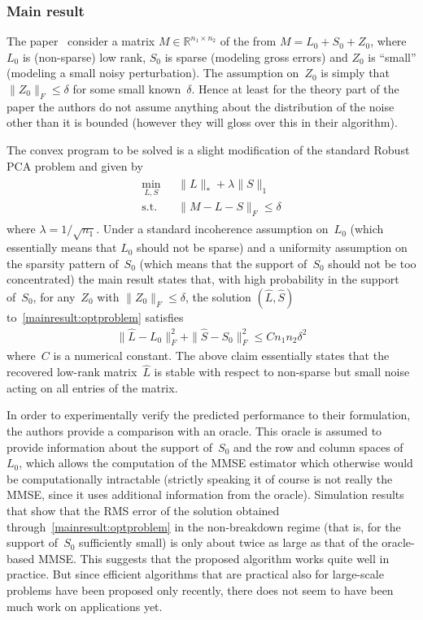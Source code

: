 \subsubsection{Main result}

The paper~\cite{Zhou:2010vn} consider a matrix $M\in\mathbb{R}^{n_1\times n_2}$ of the from $M = L_0+S_0+Z_0$, where~$L_0$ is (non-sparse) low rank, $S_0$ is sparse (modeling gross errors) and $Z_0$ is ``small'' (modeling a small noisy perturbation). The assumption on~$Z_0$ is simply that $\|Z_0\|_F \leq \delta$ for some small known~$\delta$. Hence at least for the theory part of the paper the authors do not assume anything about the distribution of the noise other than it is bounded (however they will gloss over this in their algorithm).

The convex program to be solved is a slight modification of the standard Robust PCA problem and given by
\begin{align}
\begin{split}
\min_{L,S} \; &\|L\|_* + \lambda \|S\|_1 \\
\text{s.t.} \quad &\|M-L-S\|_F \leq \delta
\end{split}
\label{mainresult:optproblem}
\end{align}
where $\lambda = 1/\sqrt{n_1}$. Under a standard incoherence assumption on~$L_0$ (which essentially means that $L_0$ should not be sparse) and a uniformity assumption on the sparsity pattern of~$S_0$ (which means that the support of~$S_0$ should not be too concentrated) the main result states that, with high probability in the support of~$S_0$, for any~$Z_0$ with $\|Z_0\|_F \leq \delta$, the solution $(\hat{L},\hat{S})$ to~\eqref{mainresult:optproblem} satisfies
\begin{align*}
\|\hat{L}-L_0\|_F^2 + \|\hat{S}-S_0\|_F^2 \leq C n_1n_2\delta^2
\end{align*}
where~$C$ is a numerical constant. The above claim essentially states that the recovered low-rank matrix~$\hat{L}$ is stable with respect to non-sparse but small noise acting on all entries of the matrix.

In order to experimentally verify the predicted performance to their formulation, the authors provide a comparison with an oracle. This oracle is assumed to provide information about the support of~$S_0$ and the row and column spaces of~$L_0$, which allows the computation of the MMSE estimator which otherwise would be computationally intractable (strictly speaking it of course is not really the MMSE, since it uses additional information from the oracle). Simulation results that show that the RMS error of the solution obtained through~\eqref{mainresult:optproblem} in the non-breakdown regime (that is, for the support of~$S_0$ sufficiently small) is only about twice as large as that of the oracle-based MMSE. This suggests that the proposed algorithm works quite well in practice. But since efficient algorithms that are practical also for large-scale problems have been proposed only recently, there does not seem to have been much work on applications yet. 



